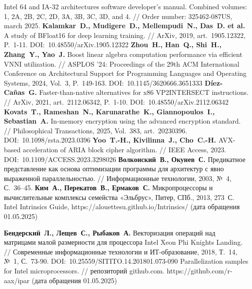 \begin{thebibliography}{99}
%
Intel 64 and IA-32 architectures software developer's manual. Combined volumes: 1, 2A, 2B, 2C, 2D, 3A, 3B, 3C, 3D, and 4. // Order number: 325462-087US, march 2025.
%
\textbf{Kalamkar~D., Mudigere~D., Mellempudi~N., Das~D. et al.} A study of BFloat16 for deep learning training. // ArXiv, 2019, art.~1905.12322, P.~1-11. DOI:~10.48550/arXiv.1905.12322
%
\textbf{Zhou~H., Han~Q., Shi~H., Zhang~Y., Yao~J.} Boost linear algebra computation performance via efficient VNNI utilization. // ASPLOS '24: Proceedings of the 29th ACM International Conference on Architectural Support for Programming Languages and Operating Systems, 2024, Vol.~3, P.~149-163. DOI:~10.1145/3620666.3651333
%
\textbf{D{\'i}ez-Ca{\~n}as~G.} Faster-than-native alternatives for x86 VP2INTERSECT instructions. // ArXiv, 2021, art.~2112.06342, P.~1-10. DOI:~10.48550/arXiv.2112.06342
%
\textbf{Kovats~T., Rameshan~N., Karunarathe~K., Giannopoulos~I., Sebastian~A.} In-memory encryption using the advanced encryption standard. // Philosophical Transactions, 2025, Vol.~383, art.~20230396. DOI:~10.1098/rsta.2023.0396
%
\textbf{Yoo~T.-H., Kivilinna~J., Cho~C.-H.} AVX-based acceleration of ARIA block cipher algorithm. // IEEE Access, 2023. DOI:~10.1109/ACCESS.2023.3298026
%
\textbf{Волконский~В., Окунев~С.} Предикатное представление как основа оптимизации программы для архитектур с явно выраженной параллельностью. // Информационные технологии, 2003, №~4, С.~36–45.
%
\textbf{Ким~А., Перекатов~В., Ермаков~С.} Микропроцессоры и вычислительные комплексы семейства «Эльбрус», Питер, СПб., 2013, 273~С.
%
Intel Intrinsics Guide, https://alouettesu.github.io/Intrinsics/ (дата обращения 01.05.2025)
%



%
\textbf{Бендерский~Л., Лещев~С., Рыбаков~А.} Векторизация операций над матрицами малой размерности для процессора Intel Xeon Phi Knights Landing. // Современные информационные технологии и ИТ-образование, 2018, Т.~14, №~1, С.~73-90. DOI:~10.25559/SITITO.14.201801.073-090
%
Parallelization samples for Intel microprocessors. // репозиторий github.com. https://github.com/r-aax/ipar (дата обращения 01.05.2025)
%




\end{thebibliography}
